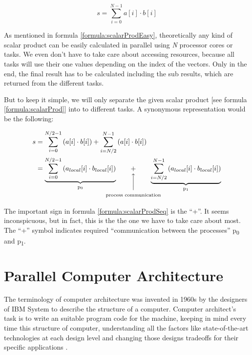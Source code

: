 \begin{equation} \label{formula:scalarProd}
	s = \sum_{i=0}^{N - 1} a[i] \cdot b[i]
\end{equation}

\newpage

As mentioned in formula \ref{formula:scalarProdEasy}, theoretically any kind of scalar product can be easily calculated in parallel using \textit{N} processor cores or tasks. We even don't have to take care about accessing resources, because all tasks will use their one values depending on the index of the vectors. Only in the end, the final result has to be calculated including the sub results, which are returned from the different tasks.

But to keep it simple, we will only separate the given scalar product [see formula \ref{formula:scalarProd}] into to different tasks. A synonymous representation would be the following:

\begin{align} \label{formula:scalarProdSeq}
	\begin{aligned}
		s &= \sum_{i = 0}^{N / 2 - 1} \left(a[i] \cdot b[i]\right) + \sum_{i = N / 2}^{N - 1} \left(a[i] \cdot b[i]\right)
		\\ &=  \underbrace{\sum_{i = 0}^{N / 2 - 1} \left(a_{local}[i] \cdot b_{local}[i]\right)}_\text{p\textsubscript{0}} \qquad \vertarrowbox{+}{process communication} \qquad \underbrace{\sum_{i = N / 2}^{N - 1} \left(a_{local}[i] \cdot b_{local}[i]\right)}_\text{p\textsubscript{1}}
	\end{aligned}
\end{align}

The important sign in formula \ref{formula:scalarProdSeq} is the ``+''. It seems inconspicuous, but in fact, this is the the one we have to take care about most. The ``+'' symbol indicates required ``communication between the processes'' \parencite[see][p]{internet2} p\textsubscript{0} and p\textsubscript{1}.

\newpage

\section{Parallel Computer Architecture}\label{chap:parallelCompArch}

The terminology of computer architecture was invented in 1960s by the designers of IBM System to describe the structure of a computer. Computer architect’s task is to write an suitable program code for the machine, keeping in mind every time this structure of computer, understanding all the factors like state-of-the-art technologies at each design level and changing those designs tradeoffs for their specific applications \parencite{article20}.

